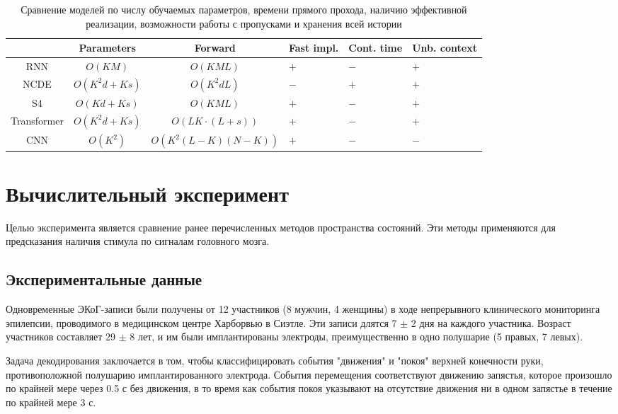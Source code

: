 \documentclass[a4paper, 12pt]{article}
\begin{document}
	\begin{table}[bhtp]
		\centering
		\caption{Сравнение моделей по числу обучаемых параметров, времени прямого прохода, наличию эффективной реализации, возможности работы с пропусками и хранения всей истории}
		\label{tbl:dl-analysis}
		\begin{tabularx}{0.95\textwidth}{c|c|c|X|X|X|}
			\cline{2-6}
			\multicolumn{1}{l|}{}             & Parameters & Forward & Fast impl. & Cont. time & Unb. context \\ \hline
			\multicolumn{1}{|c|}{RNN}         & $O(KM)$ & $O(KML)$ & $+$ & $-$ & $+$ \\ \hline
			\multicolumn{1}{|c|}{NCDE}  & $O(K^2d + Ks)$ & $O(K^2dL)$ & $-$ & $+$ & $+$ \\ \hline
			\multicolumn{1}{|c|}{S4}          & $O(Kd + Ks)$ & $O(KML)$ & $+$ & $-$ & $+$ \\ \hline
			\multicolumn{1}{|c|}{Transformer} & $O(K^2d + Ks)$ & $O(LK \cdot (L+s))$ & $+$ & $-$ & $+$ \\ \hline
			\multicolumn{1}{|c|}{CNN} & $O(K^2)$ & $O(K^2(L-K)(N-K))$ & $+$ & $-$ & $-$ \\ \hline
		\end{tabularx}
	\end{table}

	
	\section{Вычислительный эксперимент}
	Целью эксперимента является сравнение ранее перечисленных методов пространства состояний. 
	Эти методы применяются для предсказания наличия стимула по сигналам головного мозга.
	
	\subsection{Экспериментальные данные}
	Одновременные ЭКоГ-записи были получены от 12 участников (8 мужчин, 4 женщины)
	в ходе непрерывного клинического мониторинга эпилепсии, проводимого в медицинском центре Харборвью в Сиэтле.
	Эти записи длятся 7 $\pm$ 2 дня на каждого участника. Возраст участников составляет 29 $\pm$ 8 лет, и им были имплантированы электроды, преимущественно в одно полушарие (5 правых, 7 левых).
	
	Задача декодирования заключается в том, чтобы классифицировать события "движения" и "покоя" верхней конечности руки, противоположной полушарию имплантированного электрода.
	События перемещения соответствуют движению запястья, которое произошло по крайней мере через 0.5 с без движения, в то время как события покоя указывают на отсутствие движения ни в одном запястье в течение по крайней мере 3 с.
	
\end{document}
